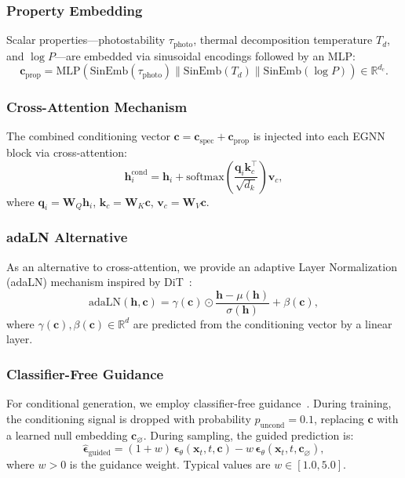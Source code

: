 \documentclass[12pt,a4paper]{article}
\providecommand{\R}{}
\renewcommand{\R}{\mathbb{R}}
\newcommand{\bx}{\bm{x}}
\newcommand{\bh}{\bm{h}}
\newcommand{\bep}{\bm{\epsilon}}
\begin{document}
\subsubsection{Property Embedding}

Scalar properties---photostability $\tau_{\text{photo}}$, thermal decomposition temperature $T_d$, and $\log P$---are embedded via sinusoidal encodings followed by an MLP:
\begin{equation}\label{eq:prop_embed}
    \bm{c}_{\text{prop}} = \text{MLP}(\text{SinEmb}(\tau_{\text{photo}}) \| \text{SinEmb}(T_d) \| \text{SinEmb}(\log P)) \in \R^{d_c}.
\end{equation}

\subsubsection{Cross-Attention Mechanism}

The combined conditioning vector $\bm{c} = \bm{c}_{\text{spec}} + \bm{c}_{\text{prop}}$ is injected into each EGNN block via cross-attention:
\begin{equation}\label{eq:cross_attn}
    \bh_i^{\text{cond}} = \bh_i + \text{softmax}\!\left(\frac{\bm{q}_i \bm{k}_c^\top}{\sqrt{d_k}}\right) \bm{v}_c,
\end{equation}
where $\bm{q}_i = \bm{W}_Q \bh_i$, $\bm{k}_c = \bm{W}_K \bm{c}$, $\bm{v}_c = \bm{W}_V \bm{c}$.

\subsubsection{adaLN Alternative}

As an alternative to cross-attention, we provide an adaptive Layer Normalization (adaLN) mechanism inspired by DiT~\cite{peebles2023dit}:
\begin{equation}\label{eq:adaln}
    \text{adaLN}(\bh, \bm{c}) = \gamma(\bm{c}) \odot \frac{\bh - \mu(\bh)}{\sigma(\bh)} + \beta(\bm{c}),
\end{equation}
where $\gamma(\bm{c}), \beta(\bm{c}) \in \R^d$ are predicted from the conditioning vector by a linear layer.

\subsubsection{Classifier-Free Guidance}

For conditional generation, we employ classifier-free guidance~\cite{ho2022classifierfree}. During training, the conditioning signal is dropped with probability $p_{\text{uncond}} = 0.1$, replacing $\bm{c}$ with a learned null embedding $\bm{c}_\varnothing$. During sampling, the guided prediction is:
\begin{equation}\label{eq:cfg}
    \hat{\bep}_{\text{guided}} = (1 + w)\, \bep_\theta(\bx_t, t, \bm{c}) - w\, \bep_\theta(\bx_t, t, \bm{c}_\varnothing),
\end{equation}
where $w > 0$ is the guidance weight. Typical values are $w \in [1.0, 5.0]$.
\end{document}
